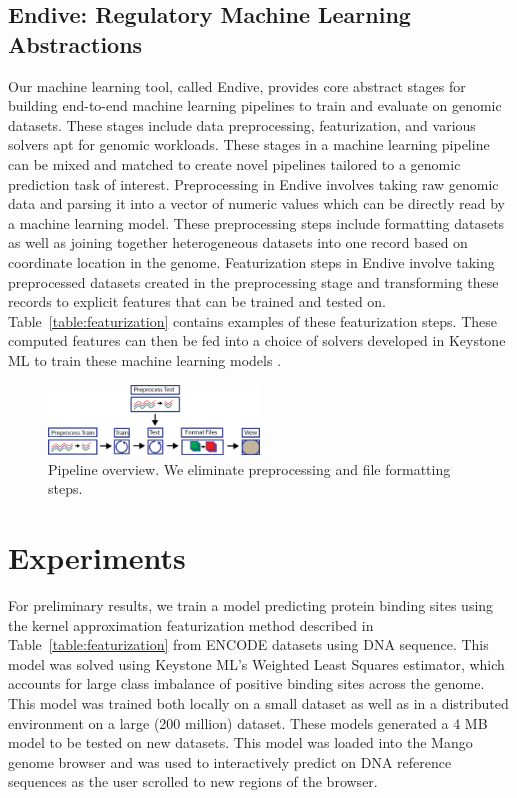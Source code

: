 \documentclass{sig-alternate-05-2015}
\begin{document}
\subsection{Endive: Regulatory Machine Learning Abstractions}
Our machine learning tool, called Endive, provides core abstract stages for building end-to-end machine learning pipelines to train and evaluate on genomic datasets. These stages include data preprocessing, featurization, and various solvers apt for genomic workloads. These stages in a machine learning pipeline can be mixed and matched to create novel pipelines tailored to a genomic prediction task of interest.
Preprocessing in Endive involves taking raw genomic data and parsing it into a vector of numeric values which can be directly read by a machine learning model. These preprocessing steps include formatting datasets as well as joining together heterogeneous datasets into one record based on coordinate location in the genome.
Featurization steps in Endive involve taking preprocessed datasets created in the preprocessing stage and transforming these records to explicit features that can be trained and tested on. Table~\ref{table:featurization} contains examples of these featurization steps. These computed features can then be fed into a choice of solvers developed in Keystone ML to train these machine learning models \cite{keystone}.


\begin{figure}
  \label{fig:pipeline}
  \includegraphics[width=0.5\textwidth]{figures/ourpipeline.png}
  \caption{Pipeline overview. We eliminate preprocessing and file formatting steps.}
\end{figure}


\section{Experiments}
For preliminary results, we train a model predicting protein binding sites using the kernel approximation featurization method described in Table~\ref{table:featurization}  from ENCODE datasets using DNA sequence. This model was solved using Keystone ML’s Weighted Least Squares estimator, which accounts for large class imbalance of positive binding sites across the genome. This model was trained both locally on a small dataset as well as in a distributed environment on a large (200 million) dataset. These models generated a 4 MB model to be tested on new datasets. This model was loaded into the Mango genome browser and was used to interactively predict on DNA reference sequences as the user scrolled to new regions of the browser.
\end{document}
